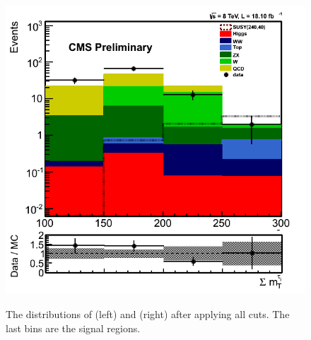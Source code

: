 \begin{figure}[!Hhtb]
\includegraphics[angle=0,scale=0.35]{TauTauFigs/summt.png} \\ 
\caption{The distributions of \mttwo (left) and \SumMT (right) after applying all cuts. The last bins are the signal regions.}
\label{fig:comparison}
\end{figure}
